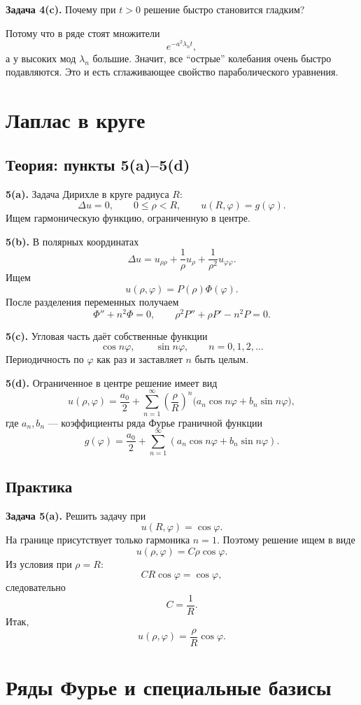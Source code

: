 \documentclass[a4paper,12pt]{article}
\begin{document}
\textbf{Задача 4(c).} Почему при $t>0$ решение быстро становится гладким?

Потому что в ряде стоят множители
\[
e^{-a^2\lambda_n t},
\]
а у высоких мод $\lambda_n$ большие. Значит, все ``острые'' колебания очень быстро подавляются. Это и есть сглаживающее свойство параболического уравнения.

\section{Лаплас в круге}

\subsection{Теория: пункты 5(a)--5(d)}

\textbf{5(a).} Задача Дирихле в круге радиуса $R$:
\[
\Delta u=0,
\qquad 0\le \rho<R,
\qquad
u(R,\varphi)=g(\varphi).
\]
Ищем гармоническую функцию, ограниченную в центре.

\textbf{5(b).} В полярных координатах
\[
\Delta u=u_{\rho\rho}+\frac1\rho u_\rho+\frac1{\rho^2}u_{\varphi\varphi}.
\]
Ищем
\[
u(\rho,\varphi)=P(\rho)\Phi(\varphi).
\]
После разделения переменных получаем
\[
\Phi''+n^2\Phi=0,
\qquad
\rho^2P''+\rho P'-n^2P=0.
\]

\textbf{5(c).} Угловая часть даёт собственные функции
\[
\cos n\varphi,
\qquad
\sin n\varphi,
\qquad n=0,1,2,\dots
\]
Периодичность по $\varphi$ как раз и заставляет $n$ быть целым.

\textbf{5(d).} Ограниченное в центре решение имеет вид
\[
u(\rho,\varphi)=\frac{a_0}{2}
+\sum_{n=1}^\infty \left(\frac{\rho}{R}\right)^n
\bigl(a_n\cos n\varphi+b_n\sin n\varphi\bigr),
\]
где $a_n,b_n$ --- коэффициенты ряда Фурье граничной функции
\[
g(\varphi)=\frac{a_0}{2}+\sum_{n=1}^\infty (a_n\cos n\varphi+b_n\sin n\varphi).
\]

\subsection{Практика}

\textbf{Задача 5(a).} Решить задачу при
\[
u(R,\varphi)=\cos\varphi.
\]
На границе присутствует только гармоника $n=1$. Поэтому решение ищем в виде
\[
u(\rho,\varphi)=C\rho\cos\varphi.
\]
Из условия при $\rho=R$:
\[
CR\cos\varphi=\cos\varphi,
\]
следовательно
\[
C=\frac1R.
\]
Итак,
\[
u(\rho,\varphi)=\frac{\rho}{R}\cos\varphi.
\]

\section{Ряды Фурье и специальные базисы}
\end{document}
